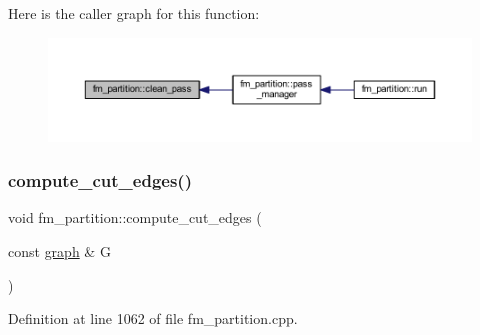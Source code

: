Here is the caller graph for this function\+:\nopagebreak
\begin{figure}[H]
\begin{center}
\leavevmode
\includegraphics[width=350pt]{classfm__partition_a15197263e5318f824e0cde66ea9132b7_icgraph}
\end{center}
\end{figure}
\mbox{\label{classfm__partition_a03c76998f985593caddc4979a28b9042}} 
\subsubsection{\texorpdfstring{compute\+\_\+cut\+\_\+edges()}{compute\_cut\_edges()}}
{\footnotesize\ttfamily void fm\+\_\+partition\+::compute\+\_\+cut\+\_\+edges (\begin{DoxyParamCaption}\item[{const \mbox{\hyperlink{classgraph}{graph}} \&}]{G }\end{DoxyParamCaption})\hspace{0.3cm}{\ttfamily [protected]}}



Definition at line 1062 of file fm\+\_\+partition.\+cpp.


